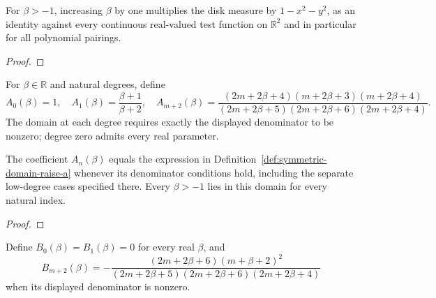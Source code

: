 \begin{supporting}
\begin{theorem}
\label{thm:disk-measure-raising}
\leanok
For $\beta>-1$, increasing $\beta$ by one multiplies the disk measure by
$1-x^2-y^2$, as an identity against every continuous real-valued test function on $\mathbb R^2$ and in particular for all
polynomial pairings.
\end{theorem}
\begin{proof}
\leanok
\end{proof}

\begin{definition}
\label{def:symmetric-domain-raise-a}
\leanok
For $\beta\in\mathbb R$ and natural degrees, define
\[
 A_0(\beta)=1,\quad A_1(\beta)=\frac{\beta+1}{\beta+2},\quad
 A_{m+2}(\beta)=\frac{(2m+2\beta+4)(m+2\beta+3)(m+2\beta+4)}
 {(2m+2\beta+5)(2m+2\beta+6)(2m+2\beta+4)}.
\]
The domain at each degree requires exactly the displayed denominator to be
nonzero; degree zero admits every real parameter.
\end{definition}

\begin{theorem}
\label{thm:symmetric-domain-raise-a}
\leanok
The coefficient $A_n(\beta)$ equals the expression in Definition~\ref{def:symmetric-domain-raise-a} whenever its denominator conditions hold, including the separate low-degree cases specified there.
Every $\beta>-1$ lies in this domain for every natural index.
\end{theorem}
\begin{proof}
\leanok
\end{proof}

\begin{definition}
\label{def:symmetric-domain-raise-b}
\leanok
Define $B_0(\beta)=B_1(\beta)=0$ for every real $\beta$, and
\[
 B_{m+2}(\beta)=-\frac{(2m+2\beta+6)(m+\beta+2)^2}
 {(2m+2\beta+5)(2m+2\beta+6)(2m+2\beta+4)}
\]
when its displayed denominator is nonzero.
\end{definition}


\end{supporting}
